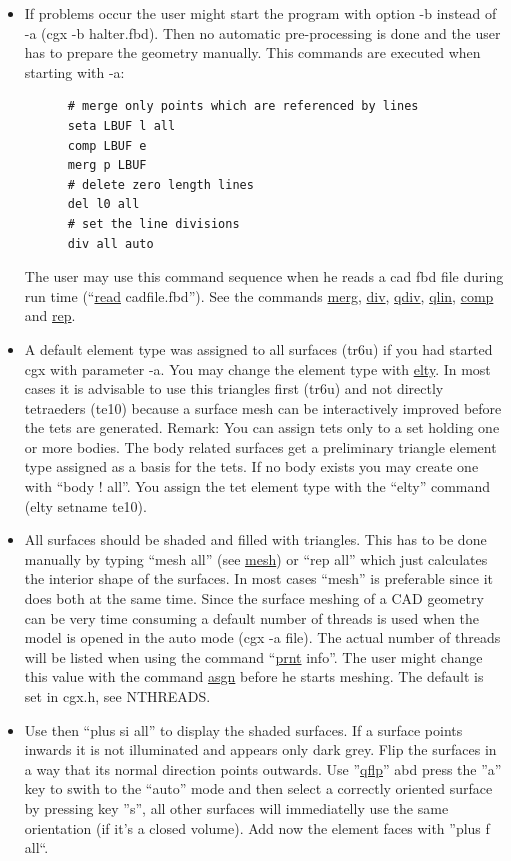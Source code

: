 \documentclass{article}
\providecommand{\htmlref}[2]{\hyperref[#2]{#1}}
\begin{document}
\begin{appendix}
\begin{itemize}
\item If problems occur the user might start the program with option -b instead of -a (cgx -b halter.fbd). Then no automatic pre-processing is done and the user has to prepare the geometry manually. This commands are executed when starting with -a:
\begin{verbatim}
      # merge only points which are referenced by lines
      seta LBUF l all
      comp LBUF e
      merg p LBUF
      # delete zero length lines
      del l0 all
      # set the line divisions
      div all auto
\end{verbatim}
The user may use this command sequence when he reads a cad fbd file during run time (``\htmlref{read}{read} cadfile.fbd''). See the commands \htmlref{merg}{merg}, \htmlref{div}{div}, \htmlref{qdiv}{qdiv}, \htmlref{qlin}{qlin}, \htmlref{comp}{comp} and \htmlref{rep}{rep}.

\item A default element type was assigned to all surfaces (tr6u) if you had started cgx with parameter -a. You may change the element type with \htmlref{elty}{elty}. In most cases it is advisable to use this triangles first (tr6u) and not directly tetraeders (te10) because a surface mesh can be interactively improved before the tets are generated. Remark: You can assign tets only to a set holding one or more bodies. The body related surfaces get a preliminary triangle element type assigned as a basis for the tets. If no body exists you may create one with ``body ! all''. You assign the tet element type with the ``elty'' command (elty setname te10).

\item All surfaces should be shaded and filled with triangles. This has to be done manually by typing ``mesh all'' (see \htmlref{mesh}{mesh}) or ``rep all'' which just calculates the interior shape of the surfaces. In most cases ``mesh'' is preferable since it does both at the same time. Since the surface meshing of a CAD geometry can be very time consuming a default number of threads is used when the model is opened in the auto mode (cgx -a file). The actual number of threads will be listed when using the command ``\htmlref{prnt}{prnt} info''. The user might change this value with the command \htmlref{asgn}{asgn} before he starts meshing. The default is set in cgx.h, see NTHREADS.

\item Use then ``plus si all'' to display the shaded surfaces. If a surface points inwards it is not illuminated and appears only dark grey. Flip the surfaces in a way that its normal direction points outwards. Use ''\htmlref{qflp}{qflp}'' abd press the ''a'' key to swith to the ``auto'' mode and then select a correctly oriented surface by pressing key ''s'', all other surfaces will immediatelly use the same orientation (if it's a closed volume). Add now the element faces with ''plus f all``.


\end{itemize}
\end{appendix}
\end{document}
